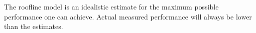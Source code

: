 \documentclass{report}
\begin{document}
The roofline model is an idealistic estimate for the maximum possible performance one can achieve. Actual measured performance will always be lower than the estimates. 









\end{document}
